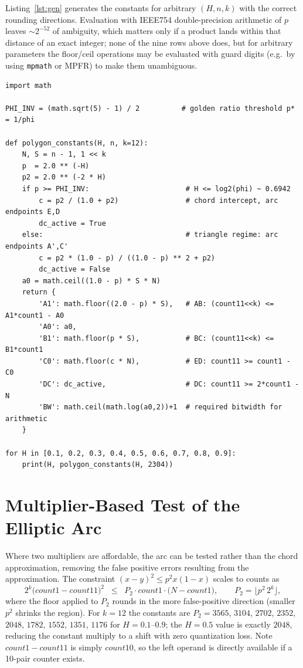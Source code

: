 \documentclass[11pt]{article}
\begin{document}
Listing~\ref{lst:gen} generates the constants for arbitrary $(H,n,k)$ with
the correct rounding directions. Evaluation with IEEE754 double-precision
arithmetic of $p$ leaves ${\sim}2^{-52}$ of ambiguity, which matters only if
a product lands within that distance of an exact integer; none of the nine
rows above does, but for arbitrary parameters the floor/ceil operations
may be evaluated with guard digits (e.g.\ by using \texttt{mpmath} or MPFR) to make
them unambiguous.

\begin{lstlisting}[caption={Generator for the integer comparator constants.},
label={lst:gen}]
import math

PHI_INV = (math.sqrt(5) - 1) / 2          # golden ratio threshold p* = 1/phi

def polygon_constants(H, n, k=12):
    N, S = n - 1, 1 << k
    p  = 2.0 ** (-H)
    p2 = 2.0 ** (-2 * H)
    if p >= PHI_INV:                       # H <= log2(phi) ~ 0.6942
        c = p2 / (1.0 + p2)                # chord intercept, arc endpoints E,D
        dc_active = True
    else:                                  # triangle regime: arc endpoints A',C'
        c = p2 * (1.0 - p) / ((1.0 - p) ** 2 + p2)
        dc_active = False
    a0 = math.ceil((1.0 - p) * S * N)
    return {
        'A1': math.floor((2.0 - p) * S),   # AB: (count11<<k) <= A1*count1 - A0
        'A0': a0,
        'B1': math.floor(p * S),           # BC: (count11<<k) <= B1*count1
        'C0': math.floor(c * N),           # ED: count11 >= count1 - C0
        'DC': dc_active,                   # DC: count11 >= 2*count1 - N
        'BW': math.ceil(math.log(a0,2))+1  # required bitwidth for arithmetic
    }

for H in [0.1, 0.2, 0.3, 0.4, 0.5, 0.6, 0.7, 0.8, 0.9]:
    print(H, polygon_constants(H, 2304))
\end{lstlisting}

\section{Multiplier-Based Test of the Elliptic Arc}
\label{sec:hardware}

Where two multipliers are affordable, the arc can be tested rather
than the chord approximation, removing the false positive errors resulting
from the approximation. The constraint
$(x-y)^2 \le p^2 x(1-x)$ scales to counts as
\begin{equation}
2^k\bigl(\mathit{count1}-\mathit{count11}\bigr)^2
\;\;\le\;\;
P_2 \cdot \mathit{count1}\cdot\bigl(N-\mathit{count1}\bigr),
\qquad
P_2 = \lfloor p^2\, 2^k \rfloor,
\label{eq:arcint}
\end{equation}
where the floor applied to $P_2$ rounds in the more false-positive
direction (smaller $p^2$ shrinks the
region). For $k=12$ the constants are $P_2 = 3565$, $3104$, $2702$, $2352$,
$2048$, $1782$, $1552$, $1351$, $1176$ for $H=0.1$--$0.9$; the $H=0.5$ value
is exactly $2048$, reducing the constant multiply to a shift with zero
quantization loss. Note $\mathit{count1}-\mathit{count11}$ is simply
$\mathit{count10}$, so the left operand is directly available if a 10-pair
counter exists.
\end{document}
